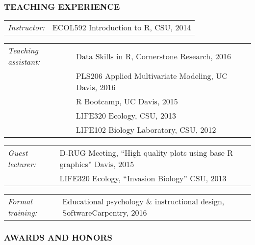 \documentclass[11pt,english]{article}
\providecommand{\tabularnewline}{\\}
\begin{document}

\vspace{1.5ex}
\subsubsection*{TEACHING EXPERIENCE}
\vspace{-0.5ex}

\begin{hangparas}{.25in}{1}

\begin{tabular}{>{\raggedright}p{1.26in}>{\raggedright}p{4.75in}}
\emph{Instructor:} & ECOL592 Introduction to R, CSU, 2014
\end{tabular}

\begin{tabular}{>{\raggedright}p{1.26in}>{\raggedright}p{4.75in}}
\emph{Teaching assistant:}  & Data Skills in R, Cornerstone Research, 2016 \tabularnewline
& PLS206 Applied Multivariate Modeling, UC Davis, 2016 \tabularnewline
& R Bootcamp, UC Davis, 2015 \tabularnewline
& LIFE320 Ecology, CSU, 2013 \tabularnewline 
& LIFE102 Biology Laboratory, CSU, 2012 \tabularnewline
\end{tabular}

\begin{tabular}{>{\raggedright}p{1.26in}>{\raggedright}p{4.75in}}
\emph{Guest lecturer:} & D-RUG Meeting, ``High quality plots using base R graphics'' Davis, 2015 \tabularnewline
& LIFE320 Ecology, ``Invasion Biology'' CSU, 2013
\end{tabular}

\begin{tabular}{>{\raggedright}p{1.26in}>{\raggedright}p{4.75in}}
\emph{Formal training:} & Educational psychology \& instructional design, SoftwareCarpentry, 2016
\end{tabular}

\end{hangparas}
\vspace{1ex}



\subsubsection*{AWARDS AND HONORS}
\vspace{-0.5ex}

\end{document}
